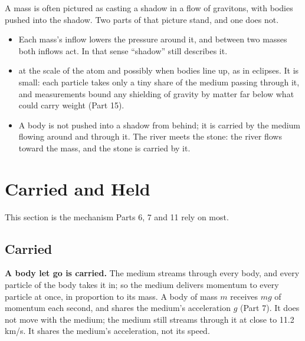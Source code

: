 A mass is often pictured as casting a shadow in a flow of gravitons, with bodies pushed into the shadow. Two parts of that picture stand, and one does not.
\begin{itemize}
\item {} Each mass's inflow lowers the pressure around it, and between two masses both inflows act. In that sense ``shadow'' still describes it.
\item {} at the scale of the atom and possibly when bodies line up, as in eclipses. It is small: each particle takes only a tiny share of the medium passing through it, and measurements bound any shielding of gravity by matter far below what could carry weight (Part 15).
\item {} A body is not pushed into a shadow from behind; it is carried by the medium flowing around and through it. The river meets the stone: the river flows toward the mass, and the stone is carried by it.
\end{itemize}

\section{Carried and Held}

This section is the mechanism Parts 6, 7 and 11 rely on most.

\subsection{Carried}

\begin{hypbar}
\textbf{A body let go is carried.} The medium streams through every body, and every particle of the body takes it in; so the medium delivers momentum to every particle at once, in proportion to its mass. A body of mass $m$ receives $mg$ of momentum each second, and shares the medium's acceleration $g$ (Part 7). It does not move with the medium; the medium still streams through it at close to 11.2 km/s. It shares the medium's acceleration, not its speed.
\end{hypbar}

